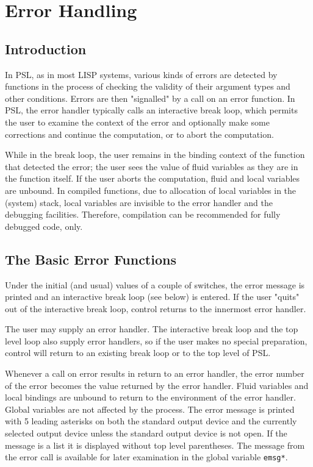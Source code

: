 \chapter*{Error Handling}

\section{Introduction}

  In  PSL,  as in most LISP systems, various kinds of errors are
detected by functions in the process of checking the validity of
their argument types and other  conditions.    Errors  are  then
"signalled"  by  a call on an error function.  In PSL, the error
handler typically calls an interactive break loop, which permits
the user to examine the context of the error and optionally make
some corrections and continue the computation, or to  abort  the
computation.

  While  in  the  break  loop,  the  user remains in the binding
context of the function that detected the error; the  user  sees
the value of fluid variables as they are in the function itself.
If  the  user  aborts the computation, fluid and local variables
are unbound. In compiled functions, due to allocation of local variables
in the (system) stack, local variables are invisible to the error
handler and the debugging facilities. Therefore, compilation can
be recommended for fully debugged code, only.

\section{The Basic Error Functions}

{    Under  the  initial  (and  usual)  values  of  a  couple  of
    switches,  the  error  message is printed and an interactive
    break loop (see below) is entered.  If the user "quits"  out
    of  the  interactive  break  loop,  control  returns  to the
    innermost error handler.  }

    The user may supply an error handler. The interactive break
    loop and the top level loop also supply error handlers, so
    if the user makes no special preparation, control will
    return to an existing break loop or to the top level of PSL.


    Whenever a call on error  results  in  return  to  an  error
    handler,  the  error  number  of the error becomes the value
    returned by the error handler.  Fluid  variables  and  local
    bindings  are  unbound  to  return to the environment of the
    error handler.  Global variables are  not  affected  by  the
    process.    The  error  message  is  printed  with 5 leading
    asterisks  on  both  the  standard  output  device  and  the
    currently  selected output device unless the standard output
    device is not open.    If  the  message  is  a  list  it  is
    displayed  without  top level parentheses.  The message from
    the error call is available for  later  examination  in  the
    global variable {\tt emsg*}.

